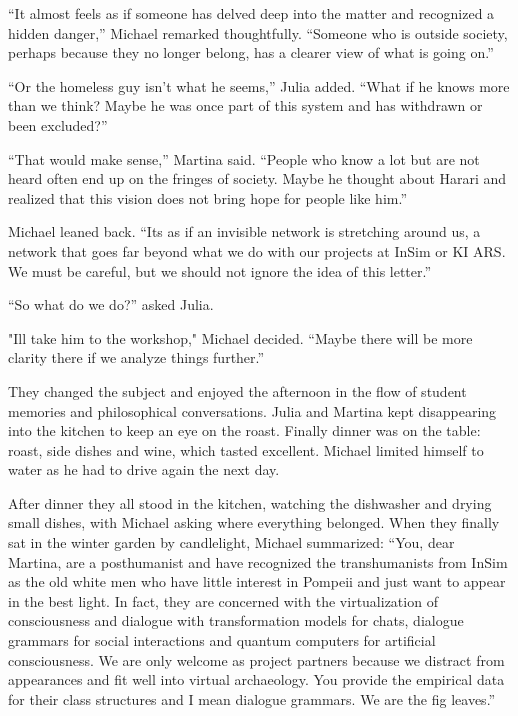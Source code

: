 \documentclass[
]{article}
\begin{document}
``It almost feels as if someone has delved deep into the matter and
recognized a hidden danger,'' Michael remarked thoughtfully. ``Someone
who is outside society, perhaps because they no longer belong, has a
clearer view of what is going on.''

``Or the homeless guy isn't what he seems,'' Julia added. ``What if he
knows more than we think? Maybe he was once part of this system and has
withdrawn or been excluded?''

``That would make sense,'' Martina said. ``People who know a lot but are
not heard often end up on the fringes of society. Maybe he thought about
Harari and realized that this vision does not bring hope for people like
him.''

Michael leaned back. ``It\textquotesingle s as if an invisible network
is stretching around us, a network that goes far beyond what we do with
our projects at InSim or KI ARS. We must be careful, but we should not
ignore the idea of \hspace{0pt}\hspace{0pt}this letter.''

``So what do we do?'' asked Julia.

"I\textquotesingle ll take him to the workshop," Michael decided.
``Maybe there will be more clarity there if we analyze things further.''

They changed the subject and enjoyed the afternoon in the flow of
student memories and philosophical conversations. Julia and Martina kept
disappearing into the kitchen to keep an eye on the roast. Finally
dinner was on the table: roast, side dishes and wine, which tasted
excellent. Michael limited himself to water as he had to drive again the
next day.

After dinner they all stood in the kitchen, watching the dishwasher and
drying small dishes, with Michael asking where everything belonged. When
they finally sat in the winter garden by candlelight, Michael
summarized: ``You, dear Martina, are a posthumanist and have recognized
the transhumanists from InSim as the old white men who have little
interest in Pompeii and just want to appear in the best light. In fact,
they are concerned with the virtualization of consciousness and dialogue
with transformation models for chats, dialogue grammars for social
interactions and quantum computers for artificial consciousness. We are
only welcome as project partners because we distract from appearances
and fit well into virtual archaeology. You provide the empirical data
for their class structures and I mean dialogue grammars. We are the fig
leaves.''
\end{document}
